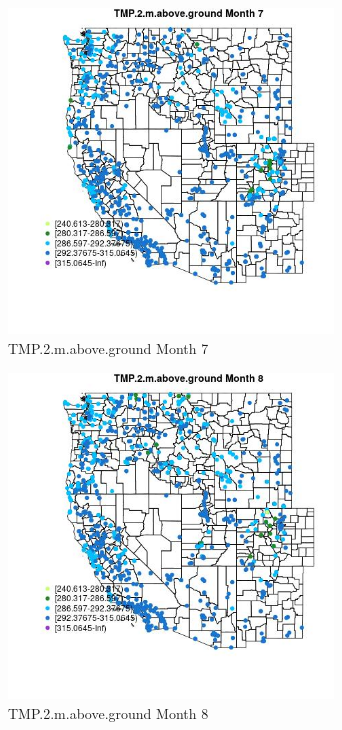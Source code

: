 \begin{figure} 
\centering  
\includegraphics[width=0.77\textwidth]{Code_Outputs/Report_ML_input_PM25_Step4_part_e_de_duplicated_aves_compiled_2019-05-21wNAs_MapObsMo7TMP2maboveground.jpg} 
\caption{\label{fig:Report_ML_input_PM25_Step4_part_e_de_duplicated_aves_compiled_2019-05-21wNAsMapObsMo7TMP2maboveground}TMP.2.m.above.ground Month 7} 
\end{figure} 
 

\begin{figure} 
\centering  
\includegraphics[width=0.77\textwidth]{Code_Outputs/Report_ML_input_PM25_Step4_part_e_de_duplicated_aves_compiled_2019-05-21wNAs_MapObsMo8TMP2maboveground.jpg} 
\caption{\label{fig:Report_ML_input_PM25_Step4_part_e_de_duplicated_aves_compiled_2019-05-21wNAsMapObsMo8TMP2maboveground}TMP.2.m.above.ground Month 8} 
\end{figure} 
 

